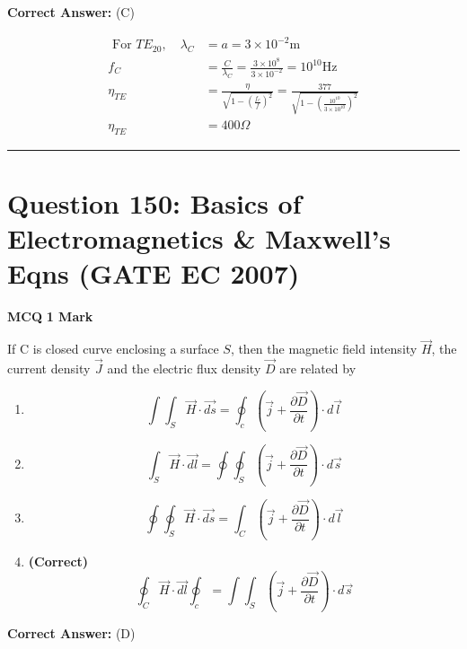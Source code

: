 \documentclass[11pt,a4paper]{article}
\begin{document}
\noindent \textbf{Correct Answer:} (C)

\begin{tcolorbox}[solbox, title=Detailed Solution -- Question 149]
\[
\begin{aligned} \text { For } TE_{20}, \quad \lambda_{C}&=a=3 \times 10^{-2} \mathrm{m} \\ f_{C}&= \frac{C}{\lambda_{C}}=\frac{3 \times 10^{8}}{3 \times 10^{-2}}=10^{10} \mathrm{Hz} \\ \eta_{T E}&=\frac{\eta}{\sqrt{1-\left(\frac{f_{c}}{f}\right)^{2}}} =\frac{377}{\sqrt{1-\left(\frac{10^{10}}{3 \times 10^{10}}\right)^{2}}}\\ \eta_{T E}&=400 \Omega \end{aligned}
\]
\end{tcolorbox}

\vspace{1.5em}
\hrule
\vspace{1.5em}

\section*{Question 150: Basics of Electromagnetics \& Maxwell's Eqns (GATE EC 2007)}
\noindent \textbf{\color{primary}MCQ} \hfill \textbf{\color{secondary}1 Mark}


\noindent If C is closed curve enclosing a surface $S$, then the magnetic field intensity $\vec{H}$, the current density $\vec{J}$ and the electric flux density $\vec{D}$ are related by


\begin{enumerate}[label=(\Alph*)]
    \item \[
\int \int_{S} \vec{H}\cdot \vec{ds}= \oint_{c}(\vec{j}+\frac{\partial \vec{D}}{\partial t})\cdot d\vec{l}
\]
    \item \[
\int_{S} \vec{H}\cdot \vec{dl}=\oint \oint_{S}(\vec{j}+\frac{\partial \vec{D}}{\partial t})\cdot d\vec{s}
\]
    \item \[
\oint \oint_{S} \vec{H}\cdot \vec{ds}=\int_{C}(\vec{j}+\frac{\partial \vec{D}}{\partial t}) \cdot d\vec{l}
\]
    \item \textbf{(Correct)} \[
\oint_{C} \vec{H}\cdot \vec{dl}\oint_{c}=\int \int_{S}(\vec{j}+\frac{\partial \vec{D}}{\partial t})\cdot d\vec{s}
\]
\end{enumerate}

\noindent \textbf{Correct Answer:} (D)
\end{document}

